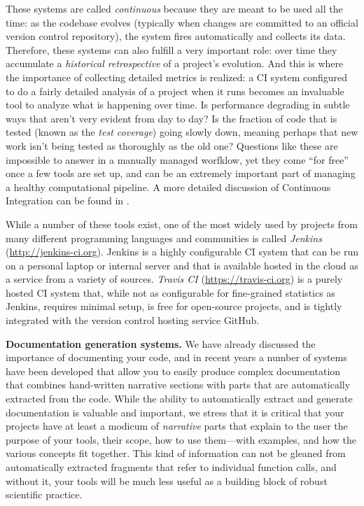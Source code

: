 \documentclass[ChapterTOCs,krantz2]{krantz} %
\newcommand{\blockpar}[1]{\vspace*{3mm} \noindent \textbf{#1}}
\begin{document}
These systems are called \emph{continuous} because they are meant to be used
all the time: as the codebase evolves (typically when changes are committed to
an official version control repository), the system fires automatically and
collects its data.  Therefore, these systems can also fulfill a very important
role: over time they accumulate a \emph{historical retrospective} of a
project's evolution.  And this is where the importance of collecting detailed
metrics is realized: a CI system configured to do a fairly detailed analysis of
a project when it runs becomes an invaluable tool to analyze what is happening
over time.  Is performance degrading in subtle ways that aren't very evident
from day to day? Is the fraction of code that is tested (known as the
\emph{test coverage}) going slowly down, meaning perhaps that new work isn't
being tested as thoroughly as the old one?  Questions like these are impossible
to answer in a manually managed worfklow, yet they come ``for free'' once a few
tools are set up, and can be an extremely important part of managing a healthy
computational pipeline.  A more detailed discussion of Continuous Integration
can be found in \cite{br-ck:2011}.

While a number of these tools exist, one of the most widely used by projects
from many different programming languages and communities is called
\emph{Jenkins} (\url{http://jenkins-ci.org}).  Jenkins is a highly configurable
CI system that can be run on a personal laptop or internal server and that is
available hosted in the cloud as a service from a variety of sources.
\emph{Travis CI} (\url{https://travis-ci.org}) is a purely hosted CI system
that, while not as configurable for fine-grained statistics as Jenkins,
requires minimal setup, is free for open-source projects, and is tightly
integrated with the version control hosting service GitHub.

\blockpar{Documentation generation systems.}
We have already discussed the importance of documenting your code, and in
recent years a number of systems have been developed that allow you to easily
produce complex documentation that combines hand-written narrative sections
with parts that are automatically extracted from the code.  While the ability
to automatically extract and generate documentation is valuable and important,
we stress that it is critical that your projects have at least a modicum of
\emph{narrative} parts that explain to the user the purpose of your tools,
their scope, how to use them---with examples, and how the various concepts fit
together.  This kind of information can not be gleaned from automatically
extracted fragments that refer to individual function calls, and without it,
your tools will be much less useful as a building block of robust scientific
practice.
\end{document}
